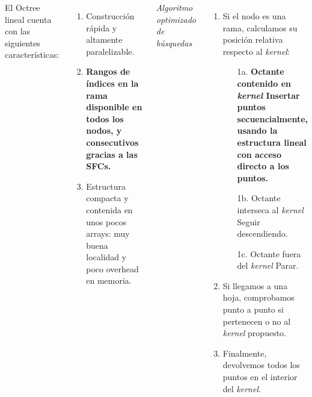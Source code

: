 \documentclass[aspectratio=169]{beamer}
\begin{document}
\begin{frame}
    \begin{columns}
        El Octree lineal cuenta con las siguientes características:
        \begin{enumerate}
            \item Construcción rápida y altamente paralelizable.
            \item \textbf{Rangos de índices en la rama disponible en todos los nodos, y consecutivos gracias a las SFCs.}
            \item Estructura compacta y contenida en unos pocos arrays: muy buena localidad y poco overhead en memoria.
        \end{enumerate}
        \textit{Algoritmo optimizado de búsquedas}
        \vspace{1em}
        \begin{enumerate}
            \item Si el nodo es una rama, calculamos su posición relativa respecto al \textit{kernel}:
              \begin{enumerate}
                    \item[1a.] \textbf{Octante contenido en \textit{kernel} \textrightarrow\: Insertar puntos secuencialmente, usando la estructura lineal con acceso directo a los puntos.}
                   \item[1b.] Octante interseca al \textit{kernel} \textrightarrow\: Seguir descendiendo.
                   \item[1c.] Octante fuera del \textit{kernel} \textrightarrow\:  Parar.
              \end{enumerate}
            \item Si llegamos a una hoja, comprobamos punto a punto si pertenecen o no al \textit{kernel} propuesto. 
            \item Finalmente, devolvemos todos los puntos en el interior del \textit{kernel}.
        \end{enumerate}
    \end{columns}

\end{frame}
\end{document}
